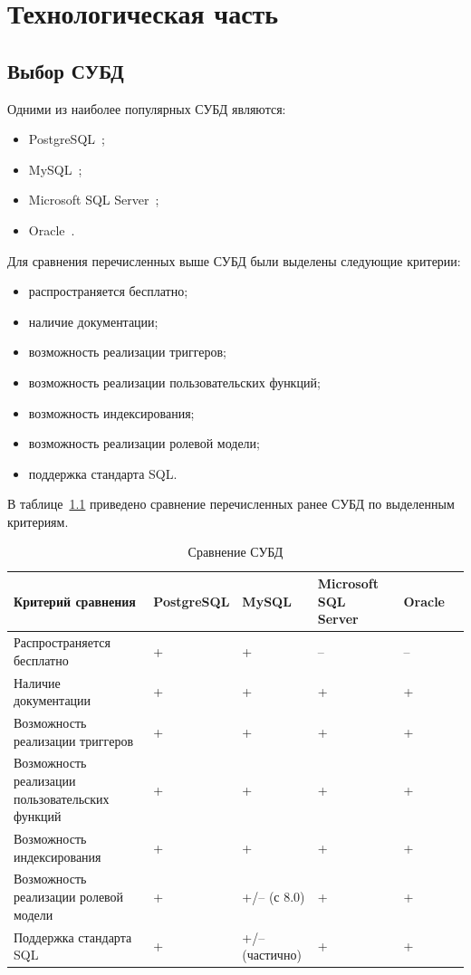 \chapter{Технологическая часть}
\section{Выбор СУБД}
Одними из наиболее популярных СУБД являются:
\begin{itemize}
	\item PostgreSQL~\cite{postgresql};
	\item MySQL~\cite{mysql};
	\item Microsoft SQL Server~\cite{msqlserver};
	\item Oracle~\cite{oracle}.
	
\end{itemize}


Для сравнения перечисленных выше СУБД были выделены следующие критерии:
\begin{itemize}
	\item распространяется бесплатно;
	\item наличие документации;
	\item возможность реализации триггеров;
	\item возможность реализации пользовательских функций;
	\item возможность индексирования;
	\item возможность реализации ролевой модели;
	\item поддержка стандарта SQL.
\end{itemize}

В таблице~\ref{pop_dbms} приведено сравнение перечисленных ранее СУБД по выделенным критериям.

\newpage
\begin{table}[ht]
	\begin{center}
		\begin{threeparttable}
			\caption{\label{pop_dbms} Сравнение СУБД}
			\begin{tabular}{|p{4cm}|p{3cm}|p{2.2cm}|p{3cm}|p{2cm}|c|}
				\hline
				\textbf{Критерий сравнения} & \textbf{PostgreSQL} & \textbf{MySQL} & \textbf{Microsoft SQL Server} & \textbf{Oracle} \\ \hline
				Распространяется бесплатно & + & + & -- & --\\ \hline
				Наличие документации & + & + & + & +\\ \hline
				Возможность реализации триггеров & + & + & + & +\\ \hline
				Возможность реализации пользовательских функций & + & + & + & +\\ \hline
				
				Возможность индексирования & + & + & + & +\\ \hline
				Возможность реализации ролевой модели & + & +/-- (с 8.0) & + & +\\ \hline
				Поддержка стандарта SQL & + & +/--(частично) & + & +\\ \hline
			\end{tabular}
		\end{threeparttable}
	\end{center}
\end{table}

